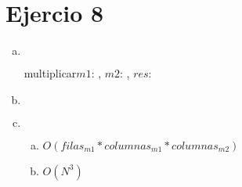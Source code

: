 \documentclass{article}
\begin{document}
\section*{Ejercio 8}
\begin{enumerate}[a)]
    \item $ $
        \begin{proc}{multiplicar}{\In $m1$: \TLista{\TLista{\ent}},
            \In $m2$: \TLista{\TLista{\ent}},
            \Out $res$: \TLista{\TLista{\ent}}}{}
        \quad\quad{}
        \end{proc}
    \item $ $
        
    \item $ $
        \begin{enumerate}[a)]
            \item $O(filas_{m1}*columnas_{m1}*columnas_{m2})$
            \item $O(N^{3})$
        \end{enumerate}
\end{enumerate}
\end{document}
